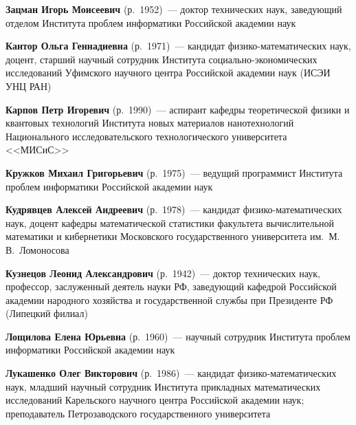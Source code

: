 \begin{multicols}{2}
\vspace*{2pt}

\noindent
\textbf{Зацман Игорь Моисеевич} (р.\ 1952)~---
доктор технических наук, заведующий отделом Института проб\-лем информатики
Российской академии наук

\columnbreak

\noindent
\textbf{Кантор Ольга Геннадиевна} (р.\ 1971)~---
кандидат фи\-зи\-ко-ма\-те\-ма\-ти\-че\-ских наук, доцент, старший научный
сотрудник Института со\-ци\-аль\-но-эко\-но\-ми\-че\-ских исследований
Уфимского научного центра Российской академии наук (ИСЭИ УНЦ РАН)

\vspace*{2pt}

\noindent
\textbf{Карпов Петр Игоревич} (р.\ 1990)~---
аспирант ка\-фед\-ры теоретической физики и квантовых технологий Института
новых материалов нанотехнологий Национального исследовательского
технологического университета <<МИСиС>>

\vspace*{2pt}


\noindent
\textbf{Кружков Михаил Григорьевич} (р.\ 1975)~---
ведущий программист Института проблем информатики Российской академии наук

\vspace*{2pt}

\noindent
\textbf{Кудрявцев Алексей Андреевич} (р.\ 1978)~---
кандидат фи\-зи\-ко-ма\-те\-ма\-ти\-че\-ских наук, доцент кафедры математической
статистики факультета вычислительной математики и кибернетики Московского
государственного университета им.\ М.\,В.~Ломоносова

\vspace*{2pt}

\noindent
\textbf{Кузнецов Леонид Александрович} (р.\ 1942)~---
доктор технических наук, профессор, заслуженный деятель науки РФ,
заведующий кафедрой Российской академии народного хозяйства и государственной
службы при Президенте РФ (Липецкий филиал)

\vspace*{2pt}

\noindent
\textbf{Лощилова Елена Юрьевна} (р.\ 1960)~---
научный сотрудник Института проблем информатики Российской академии наук

\vspace*{2pt}

\noindent
\textbf{Лукашенко Олег Викторович} (р.\ 1986)~---
 кандидат фи\-зи\-ко-ма\-те\-ма\-ти\-че\-ских наук, младший научный
 сотрудник Института прикладных математических исследований Карельского
 научного центра Российской академии наук; преподаватель Петрозаводского
 государственного университета


\end{multicols}
